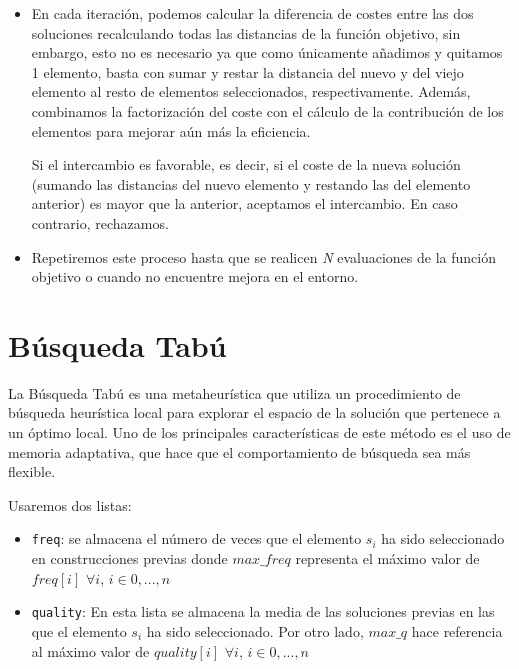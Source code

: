 \begin{itemize}
	
	\item En cada iteración, podemos calcular la diferencia de costes entre las dos soluciones recalculando todas las distancias de la función objetivo, sin embargo, esto no es necesario ya que como únicamente añadimos y quitamos 1 elemento, basta con sumar y restar la distancia del nuevo y del viejo elemento al resto de elementos seleccionados, respectivamente. Además, combinamos la factorización del coste con el cálculo de la contribución de los elementos para mejorar aún más la eficiencia.
	
	
	
	Si el intercambio es favorable, es decir, si el coste de la nueva solución (sumando las distancias del nuevo elemento y restando las del elemento anterior) es mayor que la anterior, aceptamos el intercambio. En caso contrario, rechazamos.
	
	\item Repetiremos este proceso hasta que se realicen \textit{N} evaluaciones de la función objetivo o cuando no encuentre mejora en el entorno.
	
\end{itemize}







\newpage
\section{Búsqueda Tabú}

La Búsqueda Tabú es una metaheurística que utiliza un procedimiento de búsqueda heurística local para explorar el espacio de la solución que pertenece a un óptimo local. Uno de los principales características de este método es el uso de memoria adaptativa, que hace que el comportamiento de búsqueda sea más flexible.

Usaremos dos listas:
\begin{itemize}
	\item \texttt{freq}: se almacena el número de veces que el elemento $s_i$ ha sido seleccionado en construcciones previas donde $max\_freq$ representa el máximo valor de $freq[i]$ $\forall i$, $i \in {0,...,n}$
	
	\item \texttt{quality}: En esta lista se almacena la media de las soluciones previas en las que el elemento $s_i$ ha sido seleccionado. Por otro lado, $max\_q$ hace referencia al máximo valor de $quality[i]$ $\forall i$, $i \in {0,...,n}$
\end{itemize}

